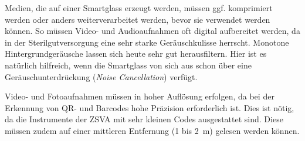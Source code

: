 Medien, die auf einer Smartglass erzeugt werden, müssen ggf. komprimiert werden oder anders weiterverarbeitet werden, bevor sie verwendet werden können. So müssen Video- und Audioaufnahmen oft digital aufbereitet werden, da in der Sterilgutversorgung eine sehr starke Geräuschkulisse herrscht. Monotone Hintergrundgeräusche lassen sich heute sehr gut herausfiltern. Hier ist es natürlich hilfreich, wenn die Smartglass von sich aus schon über eine Geräuschunterdrückung (\emph{Noise Cancellation}) verfügt.

Video- und Fotoaufnahmen müssen in hoher Auflösung erfolgen, da bei der Erkennung von QR- und Barcodes hohe Präzision erforderlich ist. Dies ist nötig, da die Instrumente der ZSVA mit sehr kleinen Codes ausgestattet sind. Diese müssen zudem auf einer mittleren Entfernung (1 bis 2~m) gelesen werden können.
%
